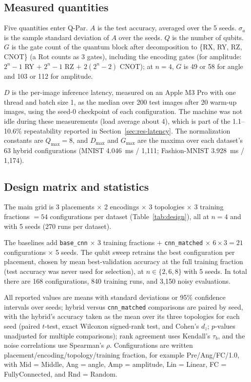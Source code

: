 \documentclass{ieeeaccess}
\begin{document}
\subsection{Measured quantities}
\label{sec:design-measured}

Five quantities enter Q-Par. $A$ is the test accuracy, averaged over the 5 seeds. $\sigma_a$ is the sample standard deviation of $A$ over the seeds. $Q$ is the number of qubits. $G$ is the gate count of the quantum block after decomposition to \{RX, RY, RZ, CNOT\} (a Rot counts as 3 gates), including the encoding gates (for amplitude: $2^n-1$ RY $+$ $2^n-1$ RZ $+$ $2(2^n-2)$ CNOT); at $n = 4$, $G$ is 49 or 58 for angle and 103 or 112 for amplitude.

$D$ is the per-image inference latency, measured on an Apple M3 Pro with one thread and batch size 1, as the median over 200 test images after 20 warm-up images, using the seed-0 checkpoint of each configuration. The machine was not idle during these measurements (load average about 4), which is part of the 1.1--10.6\% repeatability reported in Section~\ref{sec:res-latency}. The normalization constants are $Q_{\max} = 8$, and $D_{\max}$ and $G_{\max}$ are the maxima over each dataset's 63 hybrid configurations (MNIST 4.046~ms / 1,111; Fashion-MNIST 3.928~ms / 1,174).



\subsection{Design matrix and statistics}
\label{sec:design-matrix}

The main grid is 3 placements $\times$ 2 encodings $\times$ 3 topologies $\times$ 3 training fractions $= 54$ configurations per dataset (Table~\ref{tab:design}), all at $n = 4$ and with 5 seeds (270 runs per dataset).

The baselines add \texttt{base\_cnn} $\times$ 3 training fractions $+$ \texttt{cnn\_matched} $\times$ $6 \times 3 = 21$ configurations $\times$ 5 seeds. The qubit sweep retrains the best configuration per placement, chosen by mean best-validation accuracy at the full training fraction (test accuracy was never used for selection), at $n \in \{2, 6, 8\}$ with 5 seeds. In total there are 168 configurations, 840 training runs, and 3,150 noisy evaluations.

All reported values are means with standard deviations or 95\% confidence intervals over seeds; hybrid versus \texttt{cnn\_matched} comparisons are paired by seed, with the hybrid's accuracy taken as the mean over its three topologies for each seed (paired $t$-test, exact Wilcoxon signed-rank test, and Cohen's $d_z$; $p$-values unadjusted for multiple comparisons); rank agreement uses Kendall's $\tau_b$, and the noise correlations use Spearman's $\rho$. Configurations are written placement/encoding/topology/training fraction, for example Pre/Ang/FC/1.0, with Mid = Middle, Ang = angle, Amp = amplitude, Lin = Linear, FC = FullyConnected, and Rnd = Random.
\end{document}

